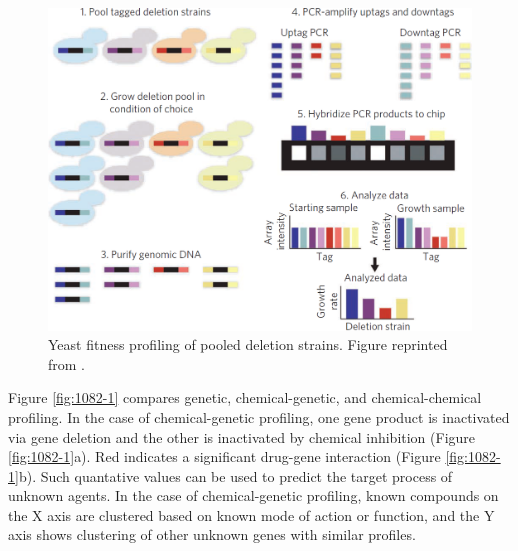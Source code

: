\documentclass[12pt,fullpage,singlespace]{article}
\begin{document}
\begin{figure}
\centering
\includegraphics[width=\linewidth]{1081-1.png}
\caption{Yeast fitness profiling of pooled deletion strains. Figure reprinted from \citep{1081}.}
\label{fig:1081-1}
\end{figure}

Figure \ref{fig:1082-1} compares genetic, chemical-genetic, and chemical-chemical profiling. In the case of chemical-genetic profiling, one gene product is inactivated via gene deletion and the other is inactivated by chemical inhibition (Figure \ref{fig:1082-1}a). Red indicates a significant drug-gene interaction (Figure \ref{fig:1082-1}b). Such quantative values can be used to predict the target process of unknown agents. In the case of chemical-genetic profiling, known compounds on the X axis are clustered based on known mode of action or function, and the Y axis shows clustering of other unknown genes with similar profiles.
\end{document}

